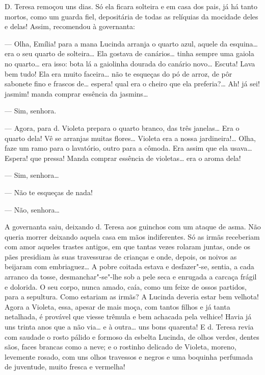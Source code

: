 D. Teresa remoçou uns dias. Só ela ficara solteira e em casa dos pais,
já há tanto mortos, como um guarda fiel, depositária de todas as
relíquias da mocidade deles e delas! Assim, recomendou à governanta:

--- Olha, Emília! para a mana Lucinda arranja o quarto azul, aquele da
esquina\ldots{} era o seu quarto de solteira\ldots{} Ela gostava de canários\ldots{}
tinha sempre uma gaiola no quarto\ldots{} era isso: bota lá a gaiolinha
dourada do canário novo\ldots{} Escuta! Lava bem tudo! Ela era muito
faceira\ldots{} não te esqueças do pó de arroz, de pôr sabonete fino e
frascos de\ldots{} espera! qual era o cheiro que ela preferia?\ldots{} Ah! já sei!
jasmim! manda comprar essência da jasmins\ldots{}

--- Sim, senhora.

--- Agora, para d. Violeta prepara o quarto branco, das três janelas\ldots{}
Era o quarto dela! Vê se arranjas muitas flores\ldots{} Violeta era a nossa
jardineira!\ldots{} Olha, faze um ramo para o lavatório, outro para a cômoda.
Era assim que ela usava\ldots{} Espera! que pressa! Manda comprar essência de
violetas\ldots{} era o aroma dela!

--- Sim, senhora\ldots{}

--- Não te esqueças de nada!

--- Não, senhora\ldots{}

A governanta saiu, deixando d. Teresa aos guinchos com um ataque de
asma. Não queria morrer deixando aquela casa em mãos indiferentes. Só as
irmãs receberiam com amor aqueles trastes antigos, em que tantas vezes
rolaram juntas, onde os pães presidiam às suas travessuras de crianças e
onde, depois, os noivos as beijaram com embriaguez\ldots{} A pobre coitada
estava e desfazer"-se, sentia, a cada arranco da tosse, desmanchar"-se"-lhe
sob a pele seca e enrugada a carcaça frágil e dolorida. O seu corpo,
nunca amado, caía, como um feixe de ossos partidos, para a sepultura.
Como estariam as irmãs? A Lucinda deveria estar bem velhota! Agora a
Violeta, essa, apesar de mais moça, com tantos filhos e já tanta
netalhada, é provável que viesse trêmula e bem achacada pela velhice!
Havia já uns trinta anos que a não via\ldots{} e à outra\ldots{} uns bons
quarenta! E d. Teresa revia com saudade o rosto pálido e formoso da
esbelta Lucinda, de olhos verdes, dentes sãos, faces brancas como a
neve; e o rostinho delicado de Violeta, moreno, levemente rosado, com
uns olhos travessos e negros e uma boquinha perfumada de juventude,
muito fresca e vermelha!

